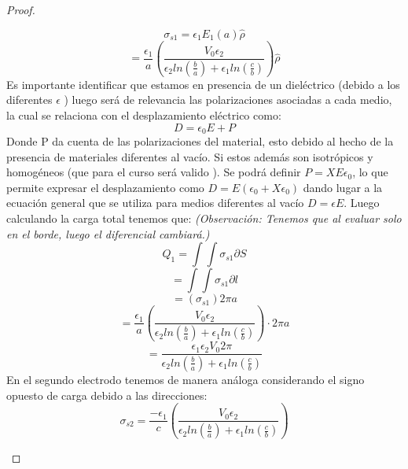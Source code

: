 \begin{proof}
\begin{enumerate}
    \begin{equation}
        \sigma_{s1} = \epsilon_{1}E_{1}(a) \hat{\rho}
    \end{equation}
    \begin{equation}
        = \frac{\epsilon_{1}}{a}\left(\frac{V_{0} \epsilon_{2}}{\epsilon_{2}ln(\frac{b}{a}) + \epsilon_{1} ln(\frac{c}{b})}\right)\hat{\rho}
    \end{equation}
    Es importante identificar que estamos en presencia de un dieléctrico (debido a los diferentes $\epsilon$ ) luego será de relevancia las polarizaciones asociadas a cada medio, la cual se relaciona con el desplazamiento eléctrico como:    
    \begin{equation}
        D = \epsilon_{0} E + P
    \end{equation}
    Donde P da cuenta de las polarizaciones del material, esto debido al hecho de la presencia de materiales diferentes al vacío. Si estos además son isotrópicos y homogéneos (que para el curso será valido ). Se podrá definir  $P= X E \epsilon_{0}$, lo que permite expresar el desplazamiento como $D= E(\epsilon_{0} + X\epsilon_{0}) $ dando lugar a la ecuación general que se utiliza para medios diferentes al vacío $D= \epsilon E$. Luego calculando la carga total tenemos que: \textit{(Observación: Tenemos que al evaluar solo en el borde, luego el diferencial cambiará.)}
    \begin{equation}
        Q_{1} = \int\int \sigma_{s1} \partial S
    \end{equation}
    \begin{equation}
        = \int\int \sigma_{s1} \partial l
    \end{equation}
    \begin{equation}
        = (\sigma_{s1}) 2\pi a
    \end{equation}
    \begin{equation}
        =\frac{\epsilon_{1}}{a}\left(\frac{V_{0} \epsilon_{2}}{\epsilon_{2}ln(\frac{b}{a}) + \epsilon_{1} ln(\frac{c}{b})}\right) \cdot 2\pi a
    \end{equation}
    \begin{equation}
        = \frac{\epsilon_{1}\epsilon_{2}V_{0}  2\pi}{\epsilon_{2}ln(\frac{b}{a}) + \epsilon_{1} ln(\frac{c}{b})}
    \end{equation}
    En el segundo electrodo tenemos de manera análoga considerando el signo opuesto de carga debido a las direcciones:
    \begin{equation}
        \sigma_{s2} = \frac{ -\epsilon_{1}}{c}\left(\frac{V_{0} \epsilon_{2}}{\epsilon_{2}ln(\frac{b}{a}) + \epsilon_{1} ln(\frac{c}{b})}\right)

\end{equation}
\end{enumerate}
\end{proof}
